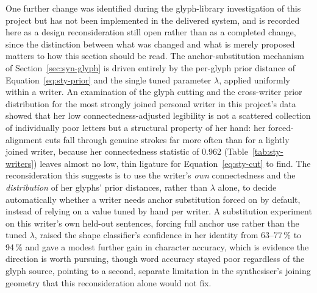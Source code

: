 One further change was identified during the glyph-library investigation of this project but has not been implemented in the delivered system, and is recorded here as a design reconsideration still open rather than as a completed change, since the distinction between what was changed and what is merely proposed matters to how this section should be read. The anchor-substitution mechanism of Section~\ref{sec:syn-glyph} is driven entirely by the per-glyph prior distance of Equation~\ref{eq:sty-prior} and the single tuned parameter $\lambda$, applied uniformly within a writer. An examination of the glyph cutting and the cross-writer prior distribution for the most strongly joined personal writer in this project's data showed that her low connectedness-adjusted legibility is not a scattered collection of individually poor letters but a structural property of her hand: her forced-alignment cuts fall through genuine strokes far more often than for a lightly joined writer, because her connectedness statistic of 0.962 (Table~\ref{tab:sty-writers}) leaves almost no low, thin ligature for Equation~\ref{eq:sty-cut} to find. The reconsideration this suggests is to use the writer's \emph{own} connectedness and the \emph{distribution} of her glyphs' prior distances, rather than $\lambda$ alone, to decide automatically whether a writer needs anchor substitution forced on by default, instead of relying on a value tuned by hand per writer. A substitution experiment on this writer's own held-out sentences, forcing full anchor use rather than the tuned $\lambda$, raised the shape classifier's confidence in her identity from 63--77\,\% to 94\,\% and gave a modest further gain in character accuracy, which is evidence the direction is worth pursuing, though word accuracy stayed poor regardless of the glyph source, pointing to a second, separate limitation in the synthesiser's joining geometry that this reconsideration alone would not fix.

